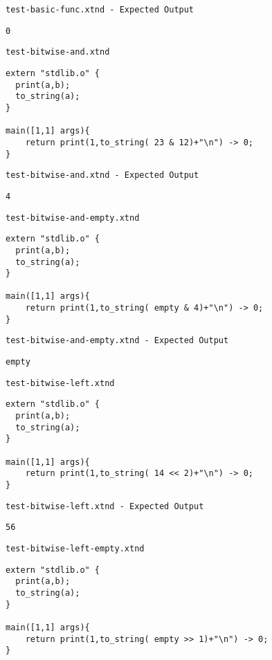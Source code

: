 \medskip \noindent \texttt{test-basic-func.xtnd - Expected Output}


\begin{lstlisting}
0
\end{lstlisting}


\medskip \noindent \texttt{test-bitwise-and.xtnd}


\begin{lstlisting}
extern "stdlib.o" {
  print(a,b);
  to_string(a);
}

main([1,1] args){
	return print(1,to_string( 23 & 12)+"\n") -> 0;
}
\end{lstlisting}


\medskip \noindent \texttt{test-bitwise-and.xtnd - Expected Output}


\begin{lstlisting}
4
\end{lstlisting}


\medskip \noindent \texttt{test-bitwise-and-empty.xtnd}


\begin{lstlisting}
extern "stdlib.o" {
  print(a,b);
  to_string(a);
}

main([1,1] args){
	return print(1,to_string( empty & 4)+"\n") -> 0;
}
\end{lstlisting}


\medskip \noindent \texttt{test-bitwise-and-empty.xtnd - Expected Output}


\begin{lstlisting}
empty
\end{lstlisting}


\medskip \noindent \texttt{test-bitwise-left.xtnd}


\begin{lstlisting}
extern "stdlib.o" {
  print(a,b);
  to_string(a);
}

main([1,1] args){
	return print(1,to_string( 14 << 2)+"\n") -> 0;
}
\end{lstlisting}


\medskip \noindent \texttt{test-bitwise-left.xtnd - Expected Output}


\begin{lstlisting}
56
\end{lstlisting}


\medskip \noindent \texttt{test-bitwise-left-empty.xtnd}


\begin{lstlisting}
extern "stdlib.o" {
  print(a,b);
  to_string(a);
}

main([1,1] args){
	return print(1,to_string( empty >> 1)+"\n") -> 0;
}
\end{lstlisting}


